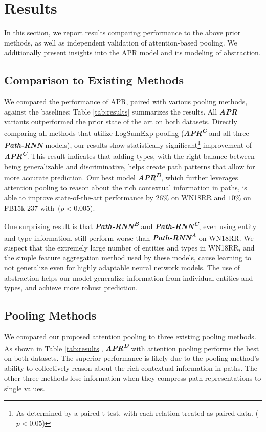 \documentclass[letterpaper]{article} %
\begin{document}
\section{Results}
In this section, we report results comparing performance to the above prior methods, as well as independent validation of attention-based pooling.  We additionally present insights into the APR model and its modeling of abstraction.

\subsection{Comparison to Existing Methods}
We compared the performance of APR, paired with various pooling methods, against the baselines; Table \ref{tab:results} summarizes the results. All \textit{\textbf{APR}} variants outperformed the prior state of the art on both datasets. Directly comparing all methods that utilize LogSumExp pooling (\textit{\textbf{APR\textsuperscript{C}}} and all three \textit{\textbf{Path-RNN}} models), our results show statistically significant\footnote{As determined by a paired t-test, with each relation treated as paired data. ($p<0.05$)} improvement of \textit{\textbf{APR\textsuperscript{C}}}.  This result indicates that adding types, with the right balance between being generalizable and discriminative, helps create path patterns that allow for more accurate prediction. Our best model \textit{\textbf{APR\textsuperscript{D}}}, which further leverages attention pooling to reason about the rich contextual information in paths, is able to improve state-of-the-art performance by $26\%$ on WN18RR and $10\%$ on FB15k-237 with~($p<0.005$).

One surprising result is that \textit{\textbf{Path-RNN\textsuperscript{B}}} and \textit{\textbf{Path-RNN\textsuperscript{C}}}, even using entity and type information, still perform worse than \textit{\textbf{Path-RNN\textsuperscript{A}}} on WN18RR. We suspect that the extremely large number of entities and types in WN18RR, and the simple feature aggregation method used by these models, cause learning to not generalize even for highly adaptable neural network models. The use of abstraction helps our model generalize information from individual entities and types, and achieve more robust prediction.
\subsection{Pooling Methods}
We compared our proposed attention pooling to three existing pooling methods. As shown in Table \ref{tab:results}, \textit{\textbf{APR\textsuperscript{D}}} with attention pooling performs the best on both datasets. The superior performance is likely due to the pooling method's ability to collectively reason about the rich contextual information in paths. The other three methods lose information when they compress path representations to single values.
\end{document}
